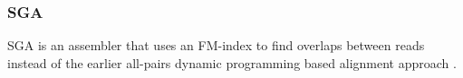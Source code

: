 \documentclass[doctor]{thesis}
\begin{document}


\subsubsection{SGA}

SGA is an assembler that uses an FM-index to find overlaps between reads instead of the earlier all-pairs dynamic programming based alignment approach  \cite{simpson2010efficient}.  
\end{document}

